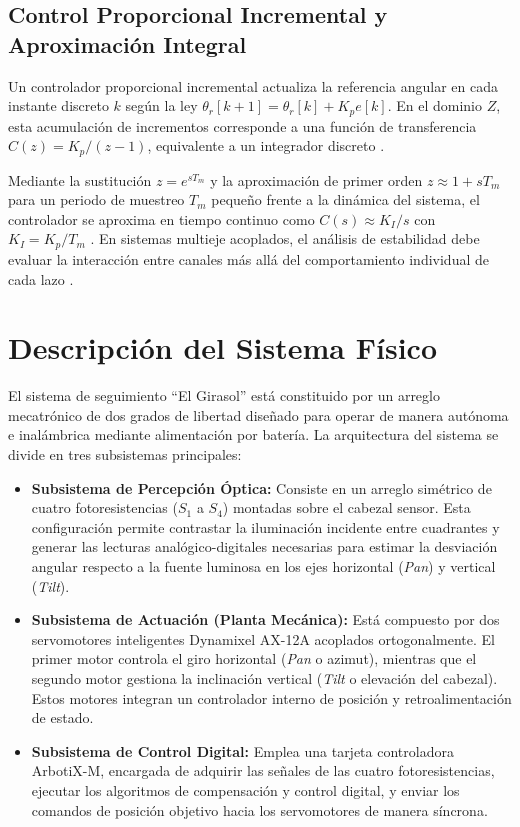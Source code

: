 \documentclass[12pt,a4paper]{article}
\begin{document}
\subsection{Control Proporcional Incremental y Aproximación Integral}
Un controlador proporcional incremental actualiza la referencia angular en cada instante discreto $k$ según la ley $\theta_r[k+1] = \theta_r[k] + K_p e[k]$. En el dominio $Z$, esta acumulación de incrementos corresponde a una función de transferencia $C(z) = K_p/(z-1)$, equivalente a un integrador discreto \cite{astrom2008feedback}.

Mediante la sustitución $z = e^{sT_m}$ y la aproximación de primer orden $z \approx 1 + sT_m$ para un periodo de muestreo $T_m$ pequeño frente a la dinámica del sistema, el controlador se aproxima en tiempo continuo como $C(s) \approx K_I/s$ con $K_I = K_p/T_m$ \cite{franklin2015feedback, astrom2008feedback}. En sistemas multieje acoplados, el análisis de estabilidad debe evaluar la interacción entre canales más allá del comportamiento individual de cada lazo \cite{dorf2016modern, astrom2008feedback}.

\section{Descripción del Sistema Físico}
El sistema de seguimiento ``El Girasol'' está constituido por un arreglo mecatrónico de dos grados de libertad diseñado para operar de manera autónoma e inalámbrica mediante alimentación por batería. La arquitectura del sistema se divide en tres subsistemas principales:

\begin{itemize}
    \item \textbf{Subsistema de Percepción Óptica:} Consiste en un arreglo simétrico de cuatro fotoresistencias ($S_1$ a $S_4$) montadas sobre el cabezal sensor. Esta configuración permite contrastar la iluminación incidente entre cuadrantes y generar las lecturas analógico-digitales necesarias para estimar la desviación angular respecto a la fuente luminosa en los ejes horizontal (\emph{Pan}) y vertical (\emph{Tilt}).
    \item \textbf{Subsistema de Actuación (Planta Mecánica):} Está compuesto por dos servomotores inteligentes Dynamixel AX-12A acoplados ortogonalmente. El primer motor controla el giro horizontal (\emph{Pan} o azimut), mientras que el segundo motor gestiona la inclinación vertical (\emph{Tilt} o elevación del cabezal). Estos motores integran un controlador interno de posición y retroalimentación de estado.
    \item \textbf{Subsistema de Control Digital:} Emplea una tarjeta controladora ArbotiX-M, encargada de adquirir las señales de las cuatro fotoresistencias, ejecutar los algoritmos de compensación y control digital, y enviar los comandos de posición objetivo hacia los servomotores de manera síncrona.
\end{itemize}
\end{document}

